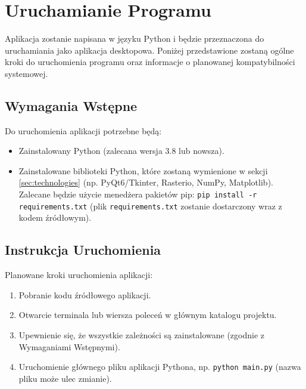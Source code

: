 \documentclass[12pt,a4paper]{article}
\begin{document}
\section{Uruchamianie Programu}
\label{sec:run}
Aplikacja zostanie napisana w języku Python i będzie przeznaczona do uruchamiania jako aplikacja desktopowa. Poniżej przedstawione zostaną ogólne kroki do uruchomienia programu oraz informacje o planowanej kompatybilności systemowej.

\subsection{Wymagania Wstępne}
Do uruchomienia aplikacji potrzebne będą:
\begin{itemize}[leftmargin=*]
    \item Zainstalowany Python (zalecana wersja 3.8 lub nowsza).
    \item Zainstalowane biblioteki Python, które zostaną wymienione w sekcji \ref{sec:technologies} (np. PyQt6/Tkinter, Rasterio, NumPy, Matplotlib). Zalecane będzie użycie menedżera pakietów pip: \texttt{pip install -r requirements.txt} (plik \texttt{requirements.txt} zostanie dostarczony wraz z kodem źródłowym).
\end{itemize}

\subsection{Instrukcja Uruchomienia}
Planowane kroki uruchomienia aplikacji:
\begin{enumerate}[leftmargin=*]
    \item Pobranie kodu źródłowego aplikacji.
    \item Otwarcie terminala lub wiersza poleceń w głównym katalogu projektu.
    \item Upewnienie się, że wszystkie zależności są zainstalowane (zgodnie z Wymaganiami Wstępnymi).
    \item Uruchomienie głównego pliku aplikacji Pythona, np. \texttt{python main.py} (nazwa pliku może ulec zmianie).
\end{enumerate}
\end{document}
